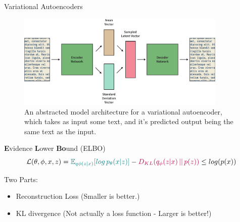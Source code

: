 \documentclass[aspectratio=169, 11pt]{beamer}
\begin{document}
\begin{frame}{Variational Autoencoders}
  \begin{figure}[!ht]
    \centering
    \includegraphics[width=100mm]{diagrams/variational_autoencoders.pdf}
    \caption{An abstracted model architecture for a variational autoencoder, which takes as input some text, and it's predicted output being the same text as the input.\label{vae}}
    \end{figure}
\end{frame}

\begin{frame}{\textbf{E}vidence \textbf{L}ower \textbf{Bo}und (ELBO)}
  \begin{equation}
    \label{eqn:elbo}
    \mathcal{L}(\theta, \phi, x, z) = \begingroup\color{teal}\mathbb{E}_{q \phi (z|x)}[log \thinspace p_{\theta}(x|z)] \endgroup - \begingroup\color{purple}D_{KL}(q_{\phi}(z|x)\thinspace||\thinspace p(z))\endgroup \leq log (p(x))
  \end{equation}
  \begin{block}{Two Parts:}
    \begin{itemize}
      \item \begingroup\color{teal}Reconstruction Loss \endgroup (Smaller is better.)
      \item \begingroup\color{purple}KL divergence \endgroup (Not actually a loss function - Larger is better!)
    \end{itemize}
  \end{block}
\end{frame}
\end{document}
